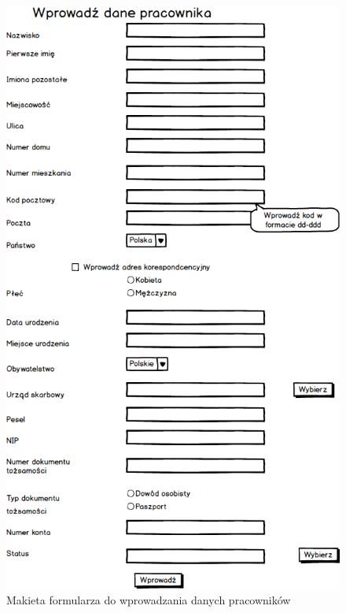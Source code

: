 \begin{figure}[tdh]
    \begin{center}
	\includegraphics[scale=.6 ]{img/makieta.png}
	\caption{Makieta formularza do wprowadzania danych pracowników}
	\label{makieta}
    \end{center}
\end{figure}
